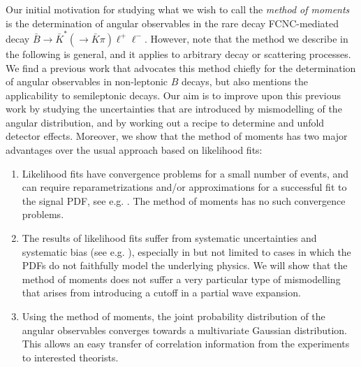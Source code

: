 \documentclass[aps,prd,reprint,nofootinbib,preprintnumbers]{revtex4}
\begin{document}
Our initial motivation for studying what we wish to call the
\emph{method of moments} is the determination of angular observables
in the rare decay FCNC-mediated decay $\bar{B}\to \bar{K}^*(\to
\bar{K}\pi)\ell^+\ell^-$. However, note that the method we
describe in the following is general, and it applies to arbitrary decay
or scattering processes. We find a previous work \cite{Dighe:1998vk}
that advocates this method chiefly for the determination of angular
observables in non-leptonic $B$ decays, but also mentions the
applicability to semileptonic decays. Our aim is to improve upon this previous
work by studying the uncertainties that are introduced by mismodelling
of the angular distribution, and by working out a recipe to determine
and unfold detector effects. Moreover, we show
that the method of moments has two major advantages over the usual
approach based on likelihood fits:
\begin{enumerate}
    \item Likelihood fits have convergence problems for a small number of
        events, and can require reparametrizations and/or approximations
        for a successful fit to the signal PDF, see e.g. \cite{Egede:2008uy}.
        The method of moments has no such convergence problems.
    \item The results of likelihood fits suffer from systematic uncertainties
        and systematic bias (see e.g. \cite{Egede:2008uy}), especially in but not limited
        to cases in which the PDFs do not faithfully model the underlying physics. We will
        show that the method of moments does not suffer a very particular type of
        mismodelling that arises from introducing a cutoff in a partial wave expansion.
    \item Using the method of moments, the joint probability distribution of the
        angular observables converges towards a multivariate Gaussian distribution.
        This allows an easy transfer of correlation information from the experiments to
        interested theorists.
\end{enumerate}
\end{document}
